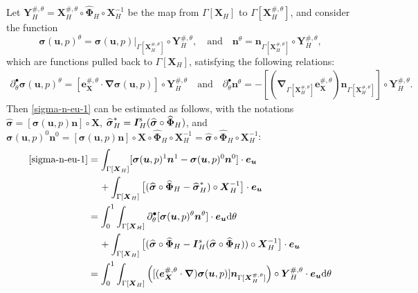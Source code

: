 \documentclass[11pt,reqno]{amsart}
\theoremstyle{definition}
\theoremstyle{plain}
\numberwithin{theorem}{section}
\numberwithin{proposition}{section}
\numberwithin{lemma}{section}
\numberwithin{equation}{section}
\newcommand{\bs}[1]{\boldsymbol{#1}}
\newcommand{\uu}[1]  {{\bs{#1}} }
\newcommand{\grad}   { \uu{\nabla}    }
\def\d{\mathrm{d}}
\newcommand{\bu}{\uu{u}}
\renewcommand{\(}{\bigl(}
\renewcommand{\)}{\bigr)}
\begin{document}
\begin{itemize}[leftmargin=20pt]
Let ${\bs Y}_H^{\#,\theta} = {\bs X}_H^{\#,\theta} \circ \widehat{\bs\Phi}_H \circ {\bs X}_H^{-1}$ be the map from $\Gamma[{\bs X}_H]$ to $\Gamma[{\bs X}_H^{\#,\theta}]$, and consider the function
$$ 
{\bs\sigma}(\bu,p)^\theta = {\bs\sigma}(\bu,p)|_{\Gamma[{\bs X}_H^{\#,\theta}]} \circ {\bs Y}_H^{\#,\theta} , 
\quad\mbox{and}\quad
{\bs n}^\theta = {\bs n}_{\Gamma[{\bs X}_H^{\#,\theta}]} \circ {\bs Y}_H^{\#,\theta} ,
 $$ 
which are functions pulled back to $\Gamma[{\bs X}_H]$, satisfying the following relations:
\begin{align*}
\partial_\theta^\bullet {\bs\sigma}(\bu,p)^\theta = [ {\bs e}_{\bs X}^{\#,\theta} \cdot  \grad {\bs\sigma}(\bu,p)] \circ {\bs Y}_H^{\#,\theta}
\quad\mbox{and}\quad
\partial_\theta^\bullet {\bs n}^\theta = - [(\grad_{\Gamma[{\bs X}_H^{\#,\theta}]} {\bs e}_{\bs X}^{\#,\theta}) {\bs n}_{\Gamma[{\bs X}_H^{\#,\theta}]} ] \circ {\bs Y}_H^{\#,\theta} .
\end{align*}
Then \eqref{sigma-n-eu-1} can be estimated as follows, with the notations ${\widehat{\bs\sigma}} = [{\bs\sigma}(\bu,p){\bs n}]\circ {\bs X}$,  ${\widehat{\bs\sigma}}_H^*={\bs I}_H^{\rm s}({\widehat{\bs \sigma} } \circ \widehat{\bs\Phi}_H)$, and ${\bs\sigma}(\bu,p)^0{\bs n}^0 = [{\bs\sigma}(\bu,p){\bs n}]\circ {\bs X} \circ \widehat{\bs\Phi}_H \circ {\bs X}_H^{-1} = {\widehat{\bs\sigma}}\circ \widehat{\bs\Phi}_H \circ {\bs X}_H^{-1} $: 
\begin{subequations}\label{sigma-n-eu-1-123}
\begin{align}
\eqref{sigma-n-eu-1}  &= \int_{\Gamma[\bs X_H]} [{\bs\sigma}(\bu,p)^1 {\bs n}^1 - {\bs\sigma}(\bu,p)^0 {\bs n}^0] \cdot {\bs e}_{\bs u} \notag\\
&\quad\,+ \int_{\Gamma[\bs X_H]} \big[ ({\widehat{\bs\sigma}} \circ \widehat{\bs\Phi}_H  - {\widehat{\bs\sigma} }_H^* )\circ {\bs X}_H^{-1} \big] \cdot {\bs e}_{\bs u} \notag\\
&= \int_0^1 \int_{\Gamma[\bs X_H]} \partial_\theta^\bullet[{\bs\sigma}(\bu,p)^\theta {\bs n}^\theta] \cdot {\bs e}_{\bs u} \d\theta \notag\\
&\quad\,+ \int_{\Gamma[\bs X_H]} \big[ ({\widehat{\bs\sigma}}\circ \widehat{\bs\Phi}_H  - {\bs I}_H^s({\widehat{\bs\sigma}}\circ \widehat{\bs\Phi}_H) )\circ {\bs X}_H^{-1} \big] \cdot {\bs e}_{\bs u} \notag\\
&= \int_0^1 \int_{\Gamma[\bs X_H]} \Big( [({\bs e}_{\bs X}^{\#,\theta} \cdot \grad) {\bs\sigma}(\bu,p)] {\bs n}_{\Gamma[{\bs X}_H^{\#,\theta}]} \Big) \circ {\bs Y}_H^{\#,\theta} \cdot {\bs e}_{\bs u} \d\theta 
\label{sigma-n-eu-1-1} \\

\end{align}
\end{subequations}
\end{itemize}
\end{document}
